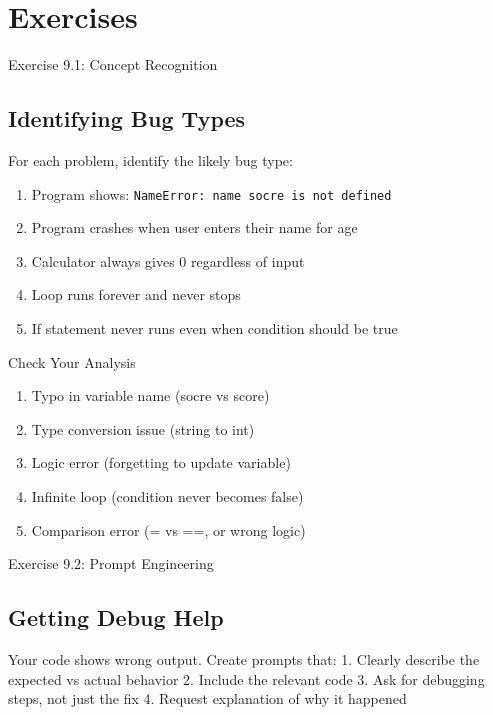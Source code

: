 \documentclass[
  letterpaper,
  DIV=11,
  numbers=noendperiod,
  oneside]{scrreprt}
\providecommand{\tightlist}{%
  \setlength{\itemsep}{0pt}\setlength{\parskip}{0pt}}\usepackage{longtable,booktabs,array}
\begin{document}
\section{Exercises}\label{exercises-9}

Exercise 9.1: Concept Recognition

\subsection{Identifying Bug Types}\label{identifying-bug-types}

For each problem, identify the likely bug type:

\begin{enumerate}
\def\labelenumi{\arabic{enumi}.}
\tightlist
\item
  Program shows:
  \texttt{NameError:\ name\ \textquotesingle{}socre\textquotesingle{}\ is\ not\ defined}
\item
  Program crashes when user enters their name for age
\item
  Calculator always gives 0 regardless of input
\item
  Loop runs forever and never stops
\item
  If statement never runs even when condition should be true
\end{enumerate}

Check Your Analysis

\begin{enumerate}
\def\labelenumi{\arabic{enumi}.}
\tightlist
\item
  Typo in variable name (socre vs score)
\item
  Type conversion issue (string to int)
\item
  Logic error (forgetting to update variable)
\item
  Infinite loop (condition never becomes false)
\item
  Comparison error (= vs ==, or wrong logic)
\end{enumerate}

Exercise 9.2: Prompt Engineering

\subsection{Getting Debug Help}\label{getting-debug-help}

Your code shows wrong output. Create prompts that: 1. Clearly describe
the expected vs actual behavior 2. Include the relevant code 3. Ask for
debugging steps, not just the fix 4. Request explanation of why it
happened
\end{document}
